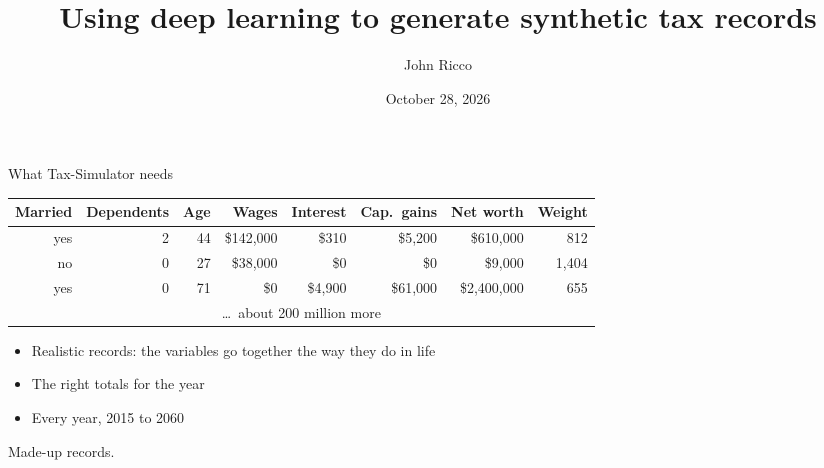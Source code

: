 \documentclass[11pt,aspectratio=169]{beamer}
\title{Using deep learning to generate synthetic tax records}
\author{John Ricco}
\institute{The Budget Lab at Yale}
\date{October 28, 2026}
\newcommand{\slidenote}[1]{\par\vfill{\scriptsize\color{yalegrey}#1}}
\begin{document}
\begin{frame}
  \titlepage
\end{frame}


\begin{frame}{What Tax-Simulator needs}
  \centering
  \small
  \begin{tabular}{rrrrrrrr}
    \toprule
    Married & Dependents & Age & Wages & Interest & Cap.\ gains & Net worth & Weight \\
    \midrule
    yes & 2 & 44 & \$142,000 & \$310   & \$5,200  & \$610,000   & 812   \\
    no  & 0 & 27 & \$38,000  & \$0     & \$0      & \$9,000     & 1,404 \\
    yes & 0 & 71 & \$0       & \$4,900 & \$61,000 & \$2,400,000 & 655   \\
    \multicolumn{8}{c}{\dots\ about 200 million more} \\
    \bottomrule
  \end{tabular}

  \vspace{1.5em}
  \normalsize
  \begin{itemize}
    \item Realistic records: the variables go together the way they do in life
    \item The right totals for the year
    \item Every year, 2015 to 2060
  \end{itemize}
  \slidenote{Made-up records.}
\end{frame}

\end{document}

